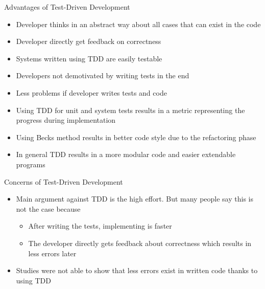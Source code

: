\begin{frame}{Advantages of Test-Driven Development}
\begin{itemize}	
	\item Developer thinks in an abstract way about all cases that can exist in the code
	\item Developer directly get feedback on correctness
	\item Systems written using TDD are easily testable
	\item Developers not demotivated by writing tests in the end
	\item Less problems if developer writes tests and code
	\item Using TDD for unit and system tests results in a metric representing the progress during implementation
	\item Using Becks method results in better code style due to the refactoring phase
	\item In general TDD results in a more modular code and easier extendable programs
\end{itemize}
\end{frame}

\begin{frame}{Concerns of Test-Driven Development}
\begin{itemize}
	\item Main argument against TDD is the high effort. But many people say this is not the case because
	\begin{itemize}
		\item After writing the tests, implementing is faster
		\item The developer directly gets feedback about correctness which results in less errors later
	\end{itemize}
	\item Studies were not able to show that less errors exist in written code thanks to using TDD
\end{itemize}
\end{frame}
